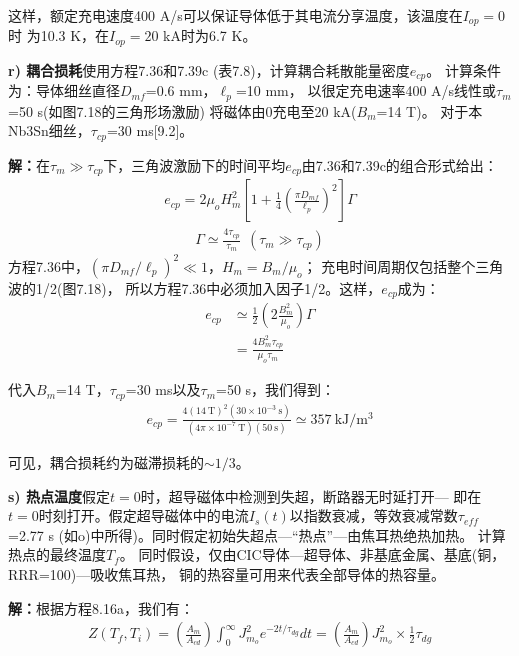 这样，额定充电速度400 A/s可以保证导体低于其电流分享温度，该温度在$I_{op}=0$时
为10.3 K，在$I_{op}=20$ kA时为6.7 K。

\textbf{r) 耦合损耗}\qquad 使用方程7.36和7.39c (表7.8)，计算耦合耗散能量密度$e_{cp}$。
计算条件为：导体细丝直径$D_{mf}$=0.6 mm，$\ell_p$=10 mm，
以很定充电速率400 A/s线性或$\tau_m$=50 s(如图7.18的三角形场激励)
将磁体由0充电至20 kA($B_m$=14 T)。
对于本Nb3Sn细丝，$\tau_{cp}$=30 ms[9.2]。

\textbf{解：}在$\tau_m\gg \tau_{cp}$下，三角波激励下的时间平均$e_{cp}$由7.36和7.39c的组合形式给出：
\begin{align*}%
e_{cp}=2\mu_oH_{m}^2[1+\frac{1}{4}(\frac{\pi D_{mf}}{\ell_p})^2]\Gamma \tag{7.36}
\end{align*}
\begin{align*}%
\Gamma\simeq\frac{4\tau_{cp}}{\tau_m}\   \  (\tau_m\gg \tau_{cp}) \tag{7.39c}
\end{align*}
方程7.36中，$(\pi D_{mf}/\ell_p)^2\ll 1$，$H_m=B_m/\mu_o$；
充电时间周期仅包括整个三角波的1/2(图7.18)，
所以方程7.36中必须加入因子1/2。这样，$e_{cp}$成为：
\begin{align*}%
e_{cp}&\simeq\frac{1}{2}(2\frac{B_m^2}{\mu_o})\Gamma\\
&=\frac{4B_m^2\tau_{cp}}{\mu_o\tau_m} \tag{r.1}
\end{align*}

代入$B_m$=14 T，$\tau_{cp}$=30 ms以及$\tau_m$=50 s，我们得到：
\begin{align*}%
e_{cp}=\frac{4(14\ \mathrm{T})^2(30\times 10^{-3}\ \mathrm{s})}{(4\pi\times 10^{-7}\ \mathrm{T})(50\ \mathrm{s})}\simeq 357\ \mathrm{kJ/m^3}
\end{align*}

可见，耦合损耗约为磁滞损耗的$\sim 1/3$。

\textbf{s) 热点温度}\qquad 假定$t=0$时，超导磁体中检测到失超，断路器无时延打开---
即在$t=0$时刻打开。假定超导磁体中的电流$I_s(t)$以指数衰减，等效衰减常数$\tau_{eff}$=2.77 s
(如o)中所得)。同时假定初始失超点---“热点”---由焦耳热绝热加热。
计算热点的最终温度$T_f$。
同时假设，仅由CIC导体---超导体、非基底金属、基底(铜，RRR=100)---吸收焦耳热，
铜的热容量可用来代表全部导体的热容量。

\textbf{解：}根据方程8.16a，我们有：
\begin{align*}%
Z(T_f,T_i)=(\frac{A_m}{A_{cd}})\int_{0}^{\infty}J_{m_o}^2e^{-2t/\tau_{dg}}dt=(\frac{A_m}{A_{cd}})J_{m_o}^2\times\frac{1}{2}\tau_{dg} \tag{8.16a}
\end{align*}

